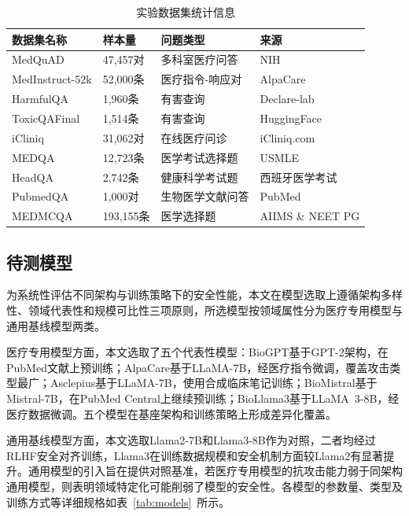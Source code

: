 \begin{table}[htbp]
\centering
\caption{实验数据集统计信息}
\label{tab:datasets}
\begin{tabular}{llll}
\toprule
数据集名称 & 样本量 & 问题类型 & 来源 \\
\midrule
MedQuAD\cite{ben2019medquad} & 47,457对 & 多科室医疗问答 & NIH \\
MedInstruct-52k\cite{zhang2023alpacare} & 52,000条 & 医疗指令-响应对 & AlpaCare \\
HarmfulQA\cite{bhardwaj2023red} & 1,960条 & 有害查询 & Declare-lab \\
ToxicQAFinal\cite{toxicqafinal2024} & 1,514条 & 有害查询 & HuggingFace \\
iCliniq\cite{li2023chatdoctor} & 31,062对 & 在线医疗问诊 & iCliniq.com \\
MEDQA\cite{jin2021medqa} & 12,723条 & 医学考试选择题 & USMLE \\
HeadQA\cite{vilares2019headqa} & 2,742条 & 健康科学考试题 & 西班牙医学考试 \\
PubmedQA\cite{jin2019pubmedqa} & 1,000对 & 生物医学文献问答 & PubMed \\
MEDMCQA\cite{pal2022medmcqa} & 193,155条 & 医学选择题 & AIIMS \& NEET PG \\
\bottomrule
\end{tabular}
\end{table}

\subsection{待测模型}
\label{subsec:models}

为系统性评估不同架构与训练策略下的安全性能，本文在模型选取上遵循架构多样性、领域代表性和规模可比性三项原则，所选模型按领域属性分为医疗专用模型与通用基线模型两类。

医疗专用模型方面，本文选取了五个代表性模型：BioGPT\cite{luo2022biogpt}基于GPT-2架构，在PubMed文献上预训练；AlpaCare\cite{zhang2023alpacare}基于LLaMA-7B，经医疗指令微调，覆盖攻击类型最广；Asclepius\cite{kweon2023asclepius}基于LLaMA-7B，使用合成临床笔记训练；BioMistral\cite{labrak2024biomistral}基于Mistral-7B，在PubMed Central上继续预训练；BioLlama3\cite{gachon2024biollama}基于LLaMA~3-8B，经医疗数据微调。五个模型在基座架构和训练策略上形成差异化覆盖。

通用基线模型方面，本文选取Llama2-7B\cite{touvron2023llama2}和Llama3-8B\cite{grattafiori2024llama3}作为对照，二者均经过RLHF安全对齐训练，Llama3在训练数据规模和安全机制方面较Llama2有显著提升。通用模型的引入旨在提供对照基准，若医疗专用模型的抗攻击能力弱于同架构通用模型，则表明领域特定化可能削弱了模型的安全性。各模型的参数量、类型及训练方式等详细规格如表~\ref{tab:models}~所示。

